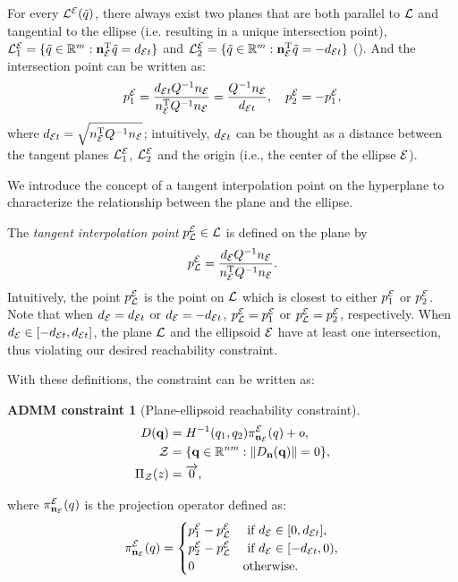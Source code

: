 \documentclass[journal]{IEEEtran}  %
\newtheorem{constraint}{ADMM constraint}
\def\sZ{\mathcal{Z}}
\begin{document}
For every ${\mathcal{L}^{\mathcal{E}}}(\tilde{q})$, there always exist two planes that are both parallel to $\mathcal{L}$ and tangential to the ellipse (i.e. resulting in a unique intersection point), $\mathcal{L}_1^{\mathcal{E}} = \{\tilde{q}\in\mathbb{R}^m: \mathbf{n}_{\mathcal{E}} ^\mathrm{T} \tilde{q} =  d_{\mathcal{E} t} \}$ and $\mathcal{L}_2^{\mathcal{E}} = \{\tilde{q}\in\mathbb{R}^m: \mathbf{n}_{\mathcal{E}} ^\mathrm{T} \tilde{q} = - d_{\mathcal{E} t} \}$  (). And the intersection point can be written as:
\begin{equation}
    p^{\mathcal{E}}_{1} = \frac{ d_{\mathcal{E} t} Q^{-1}   n_{\mathcal{E}}}{ n_{\mathcal{E}} ^\mathrm{T} Q^{-1}  n_{\mathcal{E}}} = \frac{Q^{-1} n_{\mathcal{E}}}{ d_{\mathcal{E} t}},\quad  p^{\mathcal{E}}_{2} = -  p^{\mathcal{E}}_{1},
\end{equation}
where $d_{\mathcal{E} t} = \sqrt{ n_{\mathcal{E}}^\mathrm{T} Q^{-1} n_{\mathcal{E}}}$; intuitively, $d_{\mathcal{E} t}$ can be thought as a distance between the tangent planes $\mathcal{L}_1^{\mathcal{E}}$, $\mathcal{L}_2^{\mathcal{E}}$ and the origin (i.e., the center of the ellipse $\mathcal{E}$).

We introduce the concept of a tangent interpolation point on the hyperplane to characterize the relationship between the plane and the ellipse.

\begin{definition}
The \emph{tangent interpolation point} $p^{\mathcal{E}}_{\mathcal{L}} \in \mathcal{L}$ is defined on the plane by 
    \begin{equation}\label{equ:ProjectPoint}
      p^{\mathcal{E}}_{\mathcal{L}} = \frac{ d_{\mathcal{E}} Q^{-1} n_{\mathcal{E}}}{ n_{\mathcal{E}}^\mathrm{T} Q^{-1} n_{\mathcal{E}}}.
    \end{equation}
  Intuitively, the point $p^{\mathcal{E}}_{\mathcal{L}}$ is the point on $\mathcal{L}$ which is closest to either $p^{\mathcal{E}}_1$ or $p^{\mathcal{E}}_2$.
  Note that when  $d_{\mathcal{E}}=d_{\mathcal{E} t}$ or $d_{\mathcal{E}}=-d_{\mathcal{E} t}$, $p^{\mathcal{E}}_{\mathcal{L}}=p^{\mathcal{E}}_{1}$ or $p^{\mathcal{E}}_{\mathcal{L}}=p^{\mathcal{E}}_{2}$, respectively. When $ d_{\mathcal{E}} \in [- d_{\mathcal{E} t},  d_{\mathcal{E} t}]$, the plane $\mathcal{L}$ and the ellipsoid $\mathcal{E}$ have at least one intersection, thus violating our desired reachability constraint. 
\end{definition}

With these definitions, the constraint can be written as:

\begin{constraint}[Plane-ellipsoid reachability constraint]
\begin{align}
D(\vq) &= H^{-1}(q_{1},q_2)\pi^\cE_{\vn_\cE}(q)+o, \label{eq:plane_ellipsoid_constraint}\\
  \sZ &= \{\vq\in\mathbb{R}^{nm}:\norm{D_{\vn}(\vq)} = 0 \},\\
   \Pi_\sZ(z) & = \overrightarrow{0}, 
\end{align}
\end{constraint}
where $\pi^{\mathcal{E}}_{\mathbf{n}_{\mathcal{E}}}(q)$ is the projection operator defined as:
  \begin{equation}\label{equ:plane2ellipse}
    \pi^{\mathcal{E}}_{\mathbf{n}_{\mathcal{E}}}(q) =\begin{cases}
      p^{\mathcal{E}}_{1}-p^{\mathcal{E}}_{\mathcal{L}} & \textrm{ if } d_{\mathcal{E}} \in [0, d_{\mathcal{E} t}], \\
      p^{\mathcal{E}}_{2}-p^{\mathcal{E}}_{\mathcal{L}} &  \textrm{ if } d_{\mathcal{E}} \in [- d_{\mathcal{E} t},0), \\
      {0} & \textrm{otherwise}.
    \end{cases}
  \end{equation}
\end{document}
